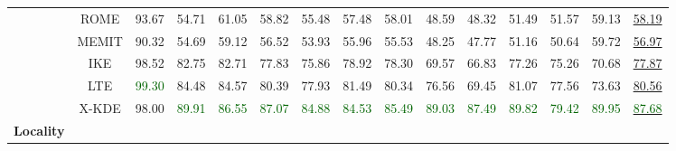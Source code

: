 \begin{table*}[!h]
{\begin{tabular}{ccccccccccccccc}
            & ROME & 93.67 & 54.71 & 61.05 & 58.82 & 55.48 & 57.48 & 58.01 & 48.59 & 48.32 & 51.49 & 51.57 & 59.13 & \underline{58.19} \\
            & MEMIT & 90.32 & 54.69 & 59.12 & 56.52 & 53.93 & 55.96 & 55.53 & 48.25 & 47.77 & 51.16 & 50.64 & 59.72 & \underline{56.97} \\
            & IKE & 98.52 & 82.75 & 82.71 & 77.83 & 75.86 & 78.92 & 78.30 & 69.57 & 66.83 & 77.26 & 75.26 & 70.68 & \underline{77.87} \\
            & LTE & \textcolor{darkgreen}{99.30} & 84.48 & 84.57 & 80.39 & 77.93 & 81.49 & 80.34 & 76.56 & 69.45 & 81.07 & 77.56 & 73.63 & \underline{80.56 }\\
           \cmidrule{2-15}
           & X-KDE & 98.00 &\textcolor{darkgreen}{ 89.91} &\textcolor{darkgreen}{ 86.55} &\textcolor{darkgreen}{ 87.07} & \textcolor{darkgreen}{84.88} & \textcolor{darkgreen}{84.53} & \textcolor{darkgreen}{85.49} & \textcolor{darkgreen}{89.03} & \textcolor{darkgreen}{87.49} & \textcolor{darkgreen}{89.82} & \textcolor{darkgreen}{79.42} & \textcolor{darkgreen}{89.95} & \underline{\textcolor{darkgreen}{87.68}} \\
           \midrule
           \multirow{7}{*}{\textbf{Locality}} 
           

\end{tabular}}
\end{table*}
